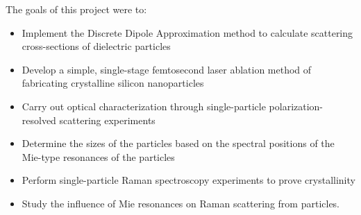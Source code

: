             The goals of this project were to:
        \begin{itemize}
            \item Implement the Discrete Dipole Approximation method to calculate scattering cross-sections of dielectric particles
            \item Develop a simple, single-stage femtosecond laser ablation method of fabricating crystalline silicon nanoparticles
            \item Carry out optical characterization through single-particle polarization-resolved scattering experiments
            \item Determine the sizes of the particles based on the spectral positions of the Mie-type resonances of the particles
            \item Perform single-particle Raman spectroscopy experiments to prove crystallinity
            \item Study the  influence of Mie resonances on Raman scattering from particles.
        \end{itemize}
